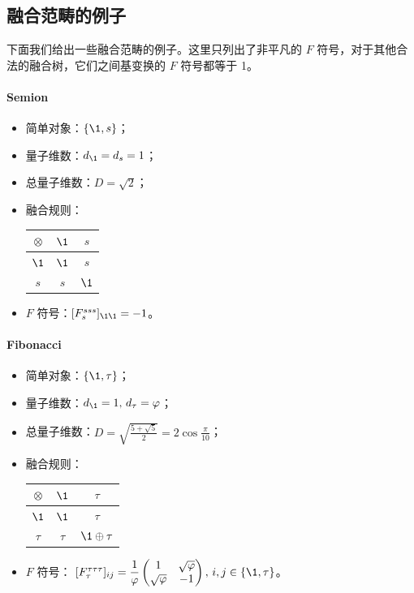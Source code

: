 \subsection{融合范畴的例子}
\label{subsec:fusion-category-examples}

下面我们给出一些融合范畴的例子\cite{rowell2009classification}。这里只列出了非平凡的 $F$ 符号，对于其他合法的融合树，它们之间基变换的 $F$ 符号都等于 1。

\paragraph{Semion}

\begin{itemize}
  \item 简单对象：$\{\1, s\}$；
  \item 量子维数：$d_{\1}=d_s=1$；
  \item 总量子维数：$D=\sqrt2$；
  \item 融合规则：
    \begin{tabular}{|c|cc|}
      \hline
      $\otimes$ & $\1$ & $s$  \\
      \hline
      $\1$      & $\1$ & $s$  \\
      $s$       & $s$  & $\1$ \\
      \hline
    \end{tabular}
  \item $F$ 符号：$[F^{sss}_s]_{\1\1}=-1$。
\end{itemize}

\paragraph{Fibonacci}

\begin{itemize}
  \item 简单对象：$\{\1, \tau\}$；
  \item 量子维数：$d_{\1}=1, \, d_\tau=\varphi$；
  \item 总量子维数：$D=\sqrt{\frac{5+\sqrt5}{2}}=2\cos\frac{\pi}{10}$；
  \item 融合规则：
    \begin{tabular}{|c|cc|}
      \hline
      $\otimes$ & $\1$   & $\tau$ \\
      \hline
      $\1$      & $\1$   & $\tau$ \\
      $\tau$    & $\tau$ & $\1\oplus\tau$ \\
      \hline
    \end{tabular}
  \item $F$ 符号：
    $
      [F^{\tau\tau\tau}_\tau]_{ij} = \dfrac1\varphi \begin{pmatrix} 1 & \sqrt\varphi \\ \sqrt\varphi & -1 \end{pmatrix}, \,
      i,j \in \{\1, \tau\}
    $。
\end{itemize}

